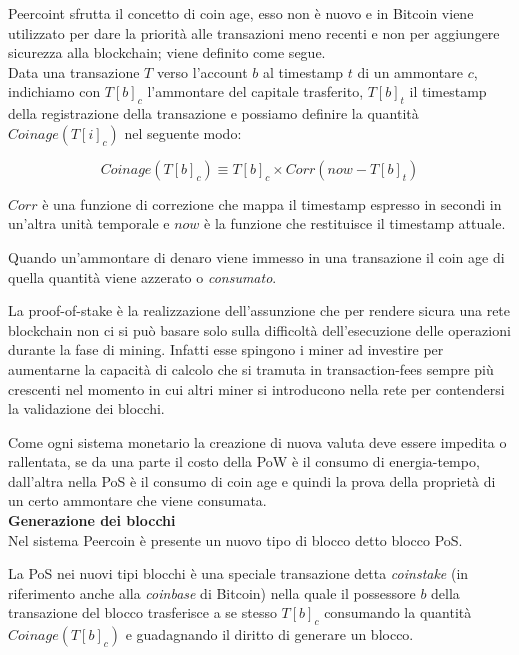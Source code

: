 	Peercoint sfrutta il concetto di coin age, esso non è nuovo e in Bitcoin viene utilizzato per dare la priorità alle transazioni meno recenti e non per aggiungere sicurezza alla blockchain; viene definito come segue.\\
	Data una transazione $T$  verso l'account $b$ al timestamp $t$ di un ammontare $c$, indichiamo con $T[b]_c$ l'ammontare del capitale trasferito, $T[b]_t$ il timestamp della registrazione della transazione e possiamo definire la quantità $Coinage(T[i]_c)$ nel seguente modo:
	
		\begin{equation}
		Coinage(T[b]_c) \equiv T[b]_c \times Corr(now - T[b]_t) 
		\end{equation}
	
	$Corr$ è una funzione di correzione che mappa il timestamp espresso in secondi in un'altra unità temporale e $now$ è la funzione che restituisce il timestamp attuale.
	
	Quando un'ammontare di denaro viene immesso in una transazione il coin age di quella quantità viene azzerato o \textit{consumato}.
	
	La proof-of-stake è la realizzazione dell'assunzione che per rendere sicura una rete blockchain non ci si può basare solo sulla difficoltà dell'esecuzione delle operazioni durante la fase di mining. Infatti esse spingono i miner ad investire per aumentarne la capacità di calcolo che si tramuta in transaction-fees sempre più crescenti nel momento in cui altri miner si introducono nella rete per contendersi la validazione dei blocchi.
	
	Come ogni sistema monetario la creazione di nuova valuta deve essere impedita o rallentata, se da una parte il costo della PoW è il consumo di energia-tempo, dall'altra nella PoS è il consumo di coin age e quindi la prova della proprietà di un certo ammontare che viene consumata.\\
	
	\textbf{Generazione dei blocchi}\\
	
	Nel sistema Peercoin è presente un nuovo tipo di blocco detto blocco PoS.
	
	La PoS nei nuovi tipi blocchi è una speciale transazione detta \textit{coinstake} (in riferimento anche alla \textit{coinbase} di Bitcoin) nella quale il possessore $b$ della transazione del blocco trasferisce a se stesso $T[b]_c$ consumando la quantità $Coinage(T[b]_c)$ e guadagnando il diritto di generare un blocco.
	
